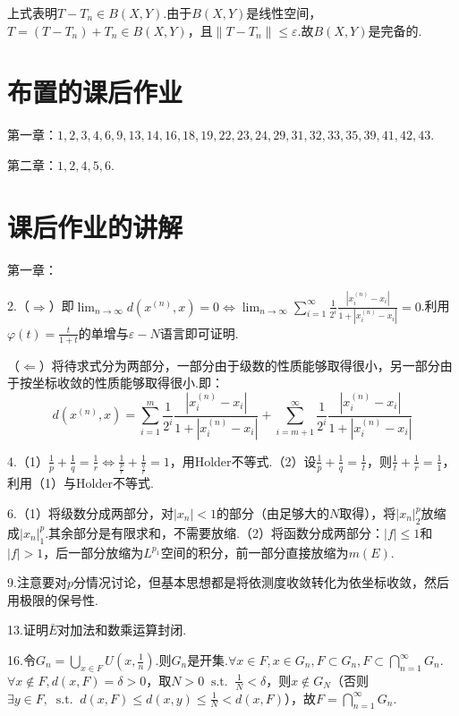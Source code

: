 \documentclass[bwprint, withoutpreface]{cumcmthesis}
\newcommand*{\st}{\mathop{}\!\mathrm{s.t.}\!\mathop{}}
\newcommand*{\norm}[1]{\| #1 \|}
\begin{document}
上式表明$T - T_n \in B(X, Y)$.由于$B(X, Y)$是线性空间，$T = (T - T_n) + T_n \in B(X, Y)$，且$\norm{T - T_n} \leqslant \varepsilon.$故$B(X, Y)$是完备的.

\appendix
\section{布置的课后作业}
第一章：$1,2,3,4,6,9,13,14,16,18,19,22,23,24,29,31,32,33,35,39,41,42,43.$

第二章：$1,2,4,5,6.$

\section{课后作业的讲解}
\noindent 第一章：

2.（$\Rightarrow$）即$\lim_{n \to \infty}{d(x^{(n)}, x)} = 0 \iff \lim_{n \to \infty}{\sum_{i = 1}^{\infty}\frac{1}{2^i}\frac{|x_i^{(n)} - x_i|}{1 + |x_i^{(n)} - x_i|}} = 0$.利用$\varphi(t) = \frac{t}{1 + t}$的单增与$\varepsilon - N$语言即可证明.

（$\Leftarrow$）将待求式分为两部分，一部分由于级数的性质能够取得很小，另一部分由于按坐标收敛的性质能够取得很小.即：
\begin{equation*}
	d(x^{(n)}, x) = \sum_{i = 1}^{m}{\frac{1}{2^i}\frac{|x_i^{(n)} - x_i|}{1 + |x_i^{(n)} - x_i|}} + \sum_{i = m + 1}^{\infty}{\frac{1}{2^i}\frac{|x_i^{(n)} - x_i|}{1 + |x_i^{(n)} - x_i|}}
\end{equation*}

4.（1）$\frac{1}{p} + \frac{1}{q} = \frac{1}{r} \iff \frac{1}{\frac{p}{r}} + \frac{1}{\frac{q}{r}} = 1$，用Holder不等式.（2）设$\frac{1}{p} + \frac{1}{q} = \frac{1}{t}$，则$\frac{1}{t} + \frac{1}{r} = \frac{1}{1}$，利用（1）与Holder不等式.

6.（1）将级数分成两部分，对$|x_n| < 1$的部分（由足够大的$N$取得），将$|x_n|^p_2$放缩成$|x_n|^p_1$.其余部分是有限求和，不需要放缩.（2）将函数分成两部分：$|f| \leqslant 1$和$|f| > 1$，后一部分放缩为$L^{p_1}$空间的积分，前一部分直接放缩为$m(E)$.

9.注意要对$p$分情况讨论，但基本思想都是将依测度收敛转化为依坐标收敛，然后用极限的保号性.

13.证明$\bar{E}$对加法和数乘运算封闭.

16.令$G_n = \bigcup_{x \in F}{U(x, \frac{1}{n})}$.则$G_n$是开集.$\forall x \in F, x \in G_n, F \subset G_n, F \subset \bigcap_{n = 1}^{\infty}{G_n}$.$\forall x \not\in F, d(x, F) = \delta > 0$，取$N > 0 \st \frac{1}{N} < \delta$，则$x \not\in G_N$（否则$\exists y \in F, \st d(x, F) \leqslant d(x, y) \leqslant \frac{1}{N} < d(x, F)$），故$F = \bigcap_{n = 1}^{\infty}{G_n}$.
\end{document}
